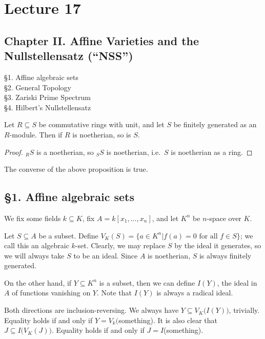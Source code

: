  \section{Lecture 17}

 \subsection{Chapter II. Affine Varieties and the Nullstellensatz (``NSS'')}
 \S 1. Affine algebraic sets\\
 \S 2. General Topology\\
 \S 3. Zariski Prime Spectrum\\
 \S 4. Hilbert's Nullstellensatz

 \smallskip

 \begin{proposition}[``Going Up'']
   Let $R\subseteq S$ be commutative rings with unit, and let $S$ be finitely generated
   as an $R$-module. Then if $R$ is noetherian, so is $S$.
 \end{proposition}
 \begin{proof}
   ${}_R S$ is a noetherian, so ${}_S S$ is noetherian, i.e.\ $S$ is noetherian as a
   ring.
 \end{proof}
 \begin{theorem}
   The converse of the above proposition is true.
 \end{theorem}

 \subsection{\S 1. Affine algebraic sets}

 We fix some fields $k\subseteq K$, fix $A=k[x_1,\dots,x_n]$, and let $K^n$ be $n$-space
 over $K$.

 Let $S\subseteq A$ be a subset. Define $V_K(S)=\{a\in K^n|f(a)=0 \text{ for all }f\in
 S\}$; we call this an algebraic $k$-set. Clearly, we may replace $S$ by the ideal it
 generates, so we will always take $S$ to be an ideal. Since $A$ is noetherian, $S$ is
 always finitely generated.

 On the other hand, if $Y\subseteq K^n$ is a subset, then we can define $I(Y)$, the
 ideal in $A$ of functions vanishing on $Y$. Note that $I(Y)$ is always a radical ideal.

 Both directions are inclusion-reversing. We always have $Y\subseteq
 V_K\bigl(I(Y)\bigr)$, trivially. Equality holds if and only if $Y=V_k($something). It is
 also clear that $J\subseteq I\bigl(V_K(J)\bigr)$. Equality holds if and only if
 $J=I$(something).

